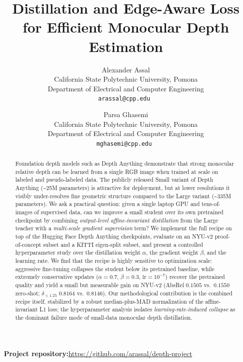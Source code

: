 \documentclass[10pt,twocolumn,letterpaper]{article}
\begin{document}
\title{Distillation and Edge-Aware Loss for Efficient Monocular Depth Estimation}

\author{Alexander Assal\\
California State Polytechnic University, Pomona\\
Department of Electrical and Computer Engineering\\
\tt\small arassal@cpp.edu
\and
Parsa Ghasemi\\
California State Polytechnic University, Pomona\\
Department of Electrical and Computer Engineering\\
\tt\small mghasemi@cpp.edu
}

\maketitle

\vspace{-1.2em}
\begin{center}
\textbf{Project repository:}\quad\url{https://github.com/arassal/depth-project}
\end{center}

\begin{abstract}
Foundation depth models such as Depth Anything demonstrate that strong
monocular relative depth can be learned from a single RGB image when
trained at scale on labeled and pseudo-labeled data. The publicly released
Small variant of Depth Anything (\textasciitilde 25M parameters) is
attractive for deployment, but at lower resolutions it visibly under-resolves
fine geometric structure compared to the Large variant
(\textasciitilde 335M parameters). We ask a practical question: given a
single laptop GPU and tens-of-images of supervised data, can we improve a
small student over its own pretrained checkpoint by combining
\emph{output-level affine-invariant distillation} from the Large teacher
with a \emph{multi-scale gradient supervision} term? We implement the full
recipe on top of the Hugging Face Depth Anything checkpoints, evaluate on
an NYU-v2 proof-of-concept subset and a KITTI eigen-split subset, and
present a controlled hyperparameter study over the distillation weight
$\alpha$, the gradient weight $\beta$, and the learning rate. We find
that the recipe is highly sensitive to optimization scale: aggressive
fine-tuning collapses the student below its pretrained baseline, while
extremely conservative updates ($\alpha=0.7$, $\beta=0.3$, $\text{lr}=10^{-7}$)
recover the pretrained quality and yield a small but measurable gain on
NYU-v2 (AbsRel $0.1505$ vs.\ $0.1550$ zero-shot; $\delta_{<1.25}$
$0.8164$ vs.\ $0.8146$). Our methodological contribution is the
combined recipe itself, stabilized by a robust median-plus-MAD
normalization of the affine-invariant L1 loss; the hyperparameter
analysis isolates \emph{learning-rate-induced collapse} as the
dominant failure mode of small-data monocular depth distillation.
\end{abstract}
\end{document}

